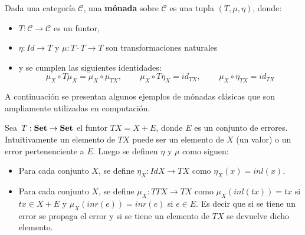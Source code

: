 \begin{definition}[Mónada]
Dada una categoría $\mathscr{C}$, una \textbf{mónada} sobre $\mathscr{C}$ es una tupla $(\mathit{T},\mu,\eta)$, donde:
\begin{itemize}[noitemsep,label=$\blacktriangleright$]
	\item $\mathit{T} : \mathscr{C} \rightarrow \mathscr{C}$ es un funtor,
	\item $\eta : \mathit{Id} \rightarrow \mathit{T}$ y $\mu : \mathit{T} \cdot \mathit{T} \rightarrow \mathit{T}$ son transformaciones naturales
	\item y se cumplen las siguientes identidades:
	\begin{equation*}
		\mu_X \circ \mathit{T}\mu_X = \mu_X \circ \mu_{\mathit{T}X} \text{, } \qquad \mu_X \circ \mathit{T}\eta_X = id_{\mathit{T}X} \text{, } \qquad 
		\mu_X \circ \eta_{\mathit{T}X} = id_{\mathit{T}X} 
	\end{equation*}
\end{itemize}
\end{definition}

A continuación se presentan algunos ejemplos de mónadas clásicas que son ampliamente utilizadas en computación.

\begin{ejemplo}
Sea $\mathit{T} : \text{\bf Set} \rightarrow \text{\bf Set}$ el funtor $\mathit{T} X = X + E$, donde $E$ es un conjunto de errores. Intuitivamente un elemento de $\mathit{T} X$ puede ser un elemento de $X$ (un valor) o un error pertenenciente a $E$. Luego se definen $\eta$ y $\mu$ como siguen:
\begin{itemize}[noitemsep, label=$\blacktriangleright$]
	\item Para cada conjunto $X$, se define $\eta_X : \mathit{Id} X \rightarrow \mathit{T} X$ como $\eta_X (x) = inl(x)$.
	\item Para cada conjunto $X$, se define $\mu_X : \mathit{T T} X \rightarrow \mathit{T} X$ como $\mu_X (inl(tx)) = tx$ si $tx \in X + E$ y $\mu_X (inr(e)) = inr(e)$ si $e \in E$. Es decir que si se tiene un error se propaga el error y si se tiene un elemento de $\mathit{T} X$ se devuelve dicho elemento. 
\end{itemize}
\end{ejemplo}

